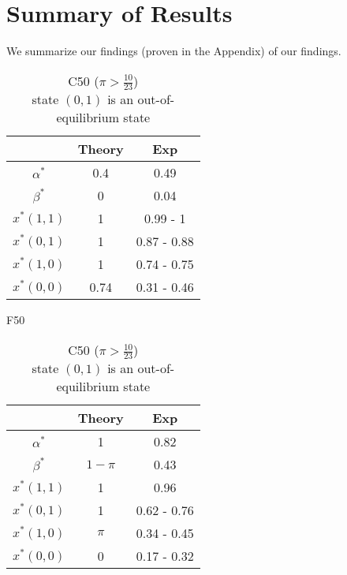 \documentclass[12pt]{article}
\begin{document}
\pagebreak
\section{Summary of Results}
We summarize our findings (proven in the Appendix) of our findings.

\begin{table}[h!]
	\begin{subtable}[]{0.45\linewidth}
	\begin{tabular}{c c c}
				& Theory 	& Exp \\
				\hline
				$\alpha^*$ 	& 0.4	& 0.49\\
				$\beta^*$ 	& 0 & 0.04\\ 
				\hline
				$x^*(1,1)$ 	& 1	& 0.99 - 1\\ 
				$x^*(0,1)$ & 1 & 0.87 - 0.88\\ 
				$x^*(1,0)$ & 1 & 0.74 - 0.75\\
				$x^*(0,0)$ & 0.74 &  0.31 - 0.46\\ 
				\hline
		\end{tabular}
		\caption*{F50}	
	\end{subtable}	
	\hfill
	\begin{subtable}{0.45\linewidth}
	\begin{tabular}{c c c}
		& Theory 	& Exp \\
		\hline
		$\alpha^*$ 	& 1	& 0.82\\
		$\beta^*$ 	& $1-\pi$ & 0.43\\ 
		\hline
		$x^*(1,1)$ 	& 1	& 0.96\\ 
		$x^*(0,1)$ & 1 & 0.62 - 0.76\\ 
		$x^*(1,0)$ & $\pi$ & 0.34 - 0.45\\
		$x^*(0,0)$ & 0 &  0.17 - 0.32\\
			\hline
\end{tabular}
\caption*{C50 ($\pi>\frac{10}{23}$)\\{\tiny state $(0,1)$ is an out-of-equilibrium state}}
\end{subtable}
\end{table}
\end{document}
